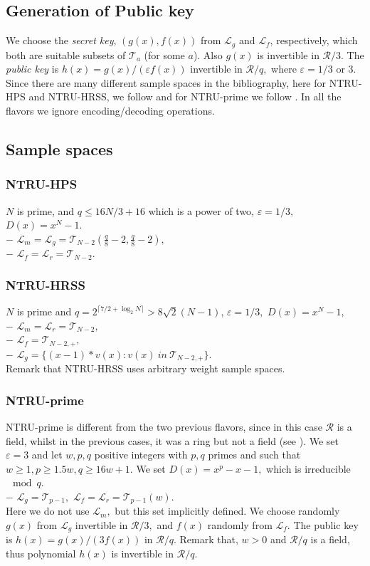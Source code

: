 \documentclass{amsart}
\numberwithin{equation}{section}
\begin{document}
\subsection{Generation of Public key}
We choose the {\it {secret key}}, $(g(x), f(x))$ from ${\mathcal{L}}_g$ and ${\mathcal{L}}_f$, respectively, which both are suitable subsets of ${\mathcal{T}}_{a}$ (for some $a$). Also $g(x)$ is invertible in ${\mathcal{R}}/3.$  The {\it {public key}} is $h(x)=g(x)/(\varepsilon f(x))$ invertible in ${\mathcal{R}}/q,$ where $\varepsilon=1/3$ or $3.$ Since there are many different sample spaces in the bibliography, here for NTRU-HPS and NTRU-HRSS, we follow \cite{nist2-ntru} and for NTRU-prime we follow \cite{ntru-prime}. In all the flavors we ignore encoding/decoding operations.
\subsection{Sample spaces}
\subsubsection{NTRU-HPS} $N$ is prime, and $q\le 16N/3+16$ which is a power of two, $\varepsilon=1/3,$ $D(x)=x^N-1.$\\
$-$ ${\mathcal{L}}_m={\mathcal{L}}_g=
{\mathcal{T}}_{N-2}(\frac{q}{8}-2,\frac{q}{8}-2),$\\
$-$ ${\mathcal{L}}_f={\mathcal{L}}_r={\mathcal{T}}_{N-2}.$
\subsubsection{NTRU-HRSS}\label{subsection:ntru-hrss} $N$ is prime and $q = 2^{\lceil 7/2+\log_2{N}\rceil} > 8\sqrt{2}(N-1)$, $\varepsilon=1/3,$ $D(x)=x^N-1,$\\
$-$ ${\mathcal{L}}_m={\mathcal{L}}_r={\mathcal{T}}_{N-2},$\\
$-$ ${\mathcal{L}}_f={\mathcal{T}}_{N-2,+},$\\
$-$ ${\mathcal{L}}_g=\{(x-1)*v(x) : v(x)\ in\ {\mathcal{T}}_{N-2,+} \}.$\\
Remark that NTRU-HRSS uses arbitrary weight sample spaces.

\subsubsection{NTRU-prime}
NTRU-prime is different from the two previous flavors, since in this case ${\mathcal{R}}$ is a field, whilst in the previous cases, it was a ring but not a field (see \cite{iot}). We set $\varepsilon=3$ and let $w,p,q$ positive integers with $p,q$ primes and such that $w\ge 1, p\ge 1.5w, q\ge 16w+1.$ We set
$D(x)=x^{p}-x-1,$ which is irreducible $\mod{ q}.$ \\
$-$ ${\mathcal{L}}_g={\mathcal{T}}_{p-1},$ ${\mathcal{L}}_f={\mathcal{L}}_r={\mathcal{T}}_{p-1}(w).$ \\
Here we do not use ${\mathcal{L}}_m,$ but this set implicitly defined. We choose randomly $g(x)$ from ${\mathcal{L}}_g$ invertible in ${\mathcal{R}}/3,$ and $f(x)$ randomly from ${\mathcal{L}}_f$.
The public key is $h(x)=g(x)/(3f(x))$ in ${\mathcal{R}}/q.$ Remark that, $w>0$ and ${\mathcal{R}}/q$ is a field, thus polynomial $h(x)$ is invertible in ${\mathcal{R}}/q.$
 
\end{document}
